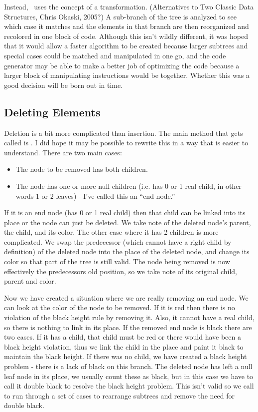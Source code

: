 Instead, \OW\ uses the concept of a transformation. (Alternatives to Two
Classic Data Structures, Chris Okaski, 2005?) A sub-branch of the tree is
analyzed to see which case it matches and the elements in that branch are then
reorganized and recolored in one block of code. Although this isn't wildly
different, it was hoped that it would allow a faster algorithm to be created
because larger subtrees and special cases could be matched and manipulated in
one go, and the code generator may be able to make a better job of optimizing
the code because a larger block of manipulating instructions would be
together. Whether this was a good decision will be born out in time.


\subsection{Deleting Elements}

Deletion is a bit more complicated than insertion. The main method that gets
called is .
I did hope it may be possible to rewrite this in a way that is easier to
understand. There are two main cases:

\begin{itemize}
\item The node to be removed has both children.
\item The node has one or more null children (i.e. has 0 or 1 real child, in
other words 1 or 2 leaves) - I've called this an ``end node.''
\end{itemize}

If it is an end node (has 0 or 1 real child) then that child can be linked
into its place or the node can just be deleted. We take note of the deleted
node's parent, the child, and its color. The other case where it has 2
children is more complicated. We swap the predecessor (which cannot have a
right child by definition) of the deleted node into the place of the deleted
node, and change its color so that part of the tree is still valid. The node
being removed is now effectively the predecessors old position, so we take
note of its original child, parent and color.

Now we have created a situation where we are really removing an end node. We
can look at the color of the node to be removed. If it is red then there is no
violation of the black height rule by removing it. Also, it cannot have a real
child, so there is nothing to link in its place. If the removed end node is
black there are two cases. If it has a child, that child must be red or there
would have been a black height violation, thus we link the child in the place
and paint it black to maintain the black height. If there was no child, we
have created a black height problem - there is a lack of black on this branch.
The deleted node has left a null leaf node in its place, we usually count
these as black, but in this case we have to call it double black to resolve
the black height problem. This isn't valid so we call
 to run through a set of cases to rearrange
subtrees and remove the need for double black.
